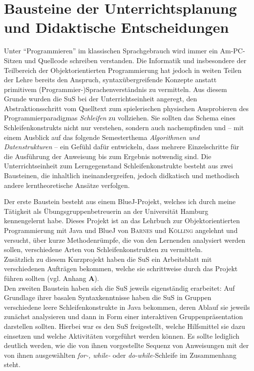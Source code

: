 \documentclass[paper=a4, DIV=13, BCOR=12mm, twoside=on, onecolumn=on, open = any, titlepage =on, parskip =half-, headsepline = on, footsepline = on, chapterprefix = on, sectionprefix = on, appendixprefix = off, fontsize = 11pt, numbers = noenddot, abstract = off]{scrreprt}
\begin{document}
\par \singlespacing
 \section{Bausteine der Unterrichtsplanung und Didaktische Entscheidungen}
\onehalfspacing
Unter "`Programmieren"' im klassischen Sprachgebrauch wird immer ein Am-PC-Sitzen und Quellcode schreiben verstanden. Die Informatik und insbesondere der Teilbereich der Objektorientierten Programmierung hat jedoch in weiten Teilen der Lehre bereits den Anspruch, syntaxübergreifende Konzepte anstatt primitivem (Programmier-)Sprachenverständnis zu vermitteln.  Aus diesem Grunde wurden die SuS bei der Unterrichtseinheit angeregt, den Abstraktionsschritt vom Quelltext zum spielerischen physischen Ausprobieren des Programmierparadigmas \emph{Schleifen} zu vollziehen. Sie sollten das Schema eines Schleifenkonstrukts nicht nur verstehen, sondern auch nachempfinden und -- mit einem Ausblick auf das folgende Semesterthema \emph{Algorithmen und Datenstrukturen} -- ein Gefühl dafür entwickeln, dass mehrere Einzelschritte für die Ausführung der Anweisung bis zum Ergebnis notwendig sind.  
Die Unterrichtseinheit zum Lerngegenstand Schleifenkonstrukte besteht aus zwei Bausteinen, die inhaltlich ineinandergreifen, jedoch didkatisch und methodisch andere lerntheoretische Ansätze verfolgen. 

Der erste Baustein besteht aus einem BlueJ-Projekt, welches ich durch meine Tätigkeit als Übungsgruppenbetreuerin an der Universität Hamburg kennengelernt habe. Dieses Projekt ist an das Lehrbuch zur Objektorientierten Programmierung mit Java und BlueJ von \textsc{Barnes} und \textsc{Kölling} angelehnt und versucht, über kurze Methodenrümpfe, die von den Lernenden analysiert werden sollen, verschiedene Arten von Schleifenkonstrukten zu vermitteln.\\
Zusätzlich zu diesem Kurzprojekt haben die SuS ein Arbeitsblatt mit verschiedenen Aufträgen bekommen, welche sie schrittweise durch das Projekt führen sollten (vgl. Anhang \textbf{A}).\\
Den zweiten Baustein haben sich die SuS jeweils eigenständig erarbeitet: Auf Grundlage ihrer basalen Syntaxkenntnisse haben die SuS in Gruppen verschiedene leere Schleifenkonstrukte in Java bekommen, deren Ablauf sie jeweils zunächst analysieren und dann in Form einer interaktiven Gruppenpräsentation darstellen sollten. Hierbei war es den SuS freigestellt, welche Hilfsmittel sie dazu einsetzen und welche Aktivitäten vorgeführt werden können. Es sollte lediglich deutlich werden, wie die von ihnen vorgestellte Sequenz von Anweisungen mit der von ihnen ausgewählten \emph{for-, while-} oder \emph{do-while-}Schleife im Zusammenhang steht.
\end{document}
